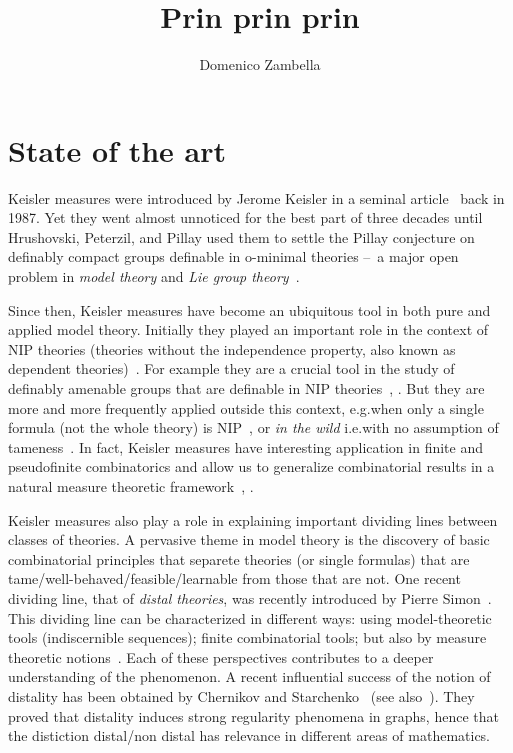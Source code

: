 \documentclass[10pt]{article}
\title{Prin prin prin}
\author{Domenico Zambella}
\begin{document}
\maketitle
\section{State of the art}
Keisler measures were introduced by Jerome Keisler in a seminal article~\cite{MR890599} back in 1987.
Yet they went almost unnoticed for the best part of three decades until Hrushovski, Peterzil, and Pillay used them to settle the Pillay conjecture on definably compact groups definable in o-minimal theories --~a major open problem in \textit{model theory\/} and \textit{Lie group theory\/}~\cite{MR2373360}.

Since then, Keisler measures have become an ubiquitous tool in both pure and applied model theory.
Initially they played an important role in the context of NIP theories (theories without the independence property, also known as dependent theories)~\cite{MR3560428}.
For example they are a crucial tool in the study of definably amenable groups that are definable in NIP theories~\cite{MR3787403}, \cite{MR2427062}.
But they are more and more frequently applied outside this context, e.g.\@ when only a single formula (not the whole theory) is NIP~\cite{MR4010500}, \cite{arXiv:2103.09946} or \textit{in the wild\/} i.e.\@ with no assumption of tameness~\cite{arXiv:2103.09946}.
In fact, Keisler measures have interesting application in finite and pseudofinite combinatorics and allow us to generalize combinatorial results in a natural measure theoretic framework~\cite{MR4222408}, \cite{MR3666030}.

Keisler measures also play a role in explaining important dividing lines between classes of theories.
A pervasive theme in model theory is the discovery of basic combinatorial principles that separete theories (or single formulas) that are tame/well-behaved/feasible/learnable from those that are not.
One recent dividing line, that of \textit{distal theories}, was recently introduced by Pierre Simon~\cite{MR3001548}.
This dividing line can be characterized in different ways: using model-theoretic tools (indiscernible sequences); finite combinatorial tools; but also by measure theoretic notions~\cite{MR3335415}.
Each of these perspectives contributes to a deeper understanding of the phenomenon.
A recent influential success of the notion of distality has been obtained by Chernikov and Starchenko~\cite{MR3852184} (see also~\cite{MR3503725}).
They proved that distality induces strong regularity phenomena in graphs, hence that the distiction distal/non distal has relevance in different areas of mathematics.
\end{document}
